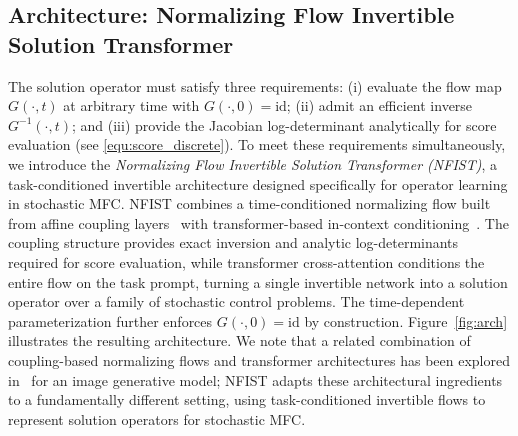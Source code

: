 \documentclass[preprint]{elsarticle}
\begin{document}
\subsection{Architecture: Normalizing Flow Invertible Solution Transformer}\label{sec:arch}

The solution operator must satisfy three requirements: (i) evaluate the flow map $G(\cdot,t)$ at arbitrary time with $G(\cdot,0)=\mathrm{id}$; (ii) admit an efficient inverse $G^{-1}(\cdot,t)$; and (iii) provide the Jacobian log-determinant analytically for score evaluation (see \eqref{equ:score_discrete}). 
To meet these requirements simultaneously, we introduce the \emph{Normalizing Flow Invertible Solution Transformer (NFIST)}, a task-conditioned invertible architecture designed specifically for operator learning in stochastic MFC. NFIST combines a time-conditioned normalizing flow built from affine coupling layers~\cite{dinh2017realnvp,rezende2015flow,Kobyzev2021,papamakarios2021nf} with transformer-based in-context conditioning~\cite{vaswani2017attention,yang2023icon}. The coupling structure provides exact inversion and analytic log-determinants required for score evaluation, while transformer cross-attention conditions the entire flow on the task prompt, turning a single invertible network into a solution operator over a family of stochastic control problems. The time-dependent parameterization further enforces $G(\cdot,0)=\mathrm{id}$ by construction. Figure~\ref{fig:arch} illustrates the resulting architecture.
We note that a related combination of coupling-based normalizing flows and transformer architectures has been explored in~\cite{kolesnikov2024jet} for an image generative model; NFIST adapts these architectural ingredients to a fundamentally different setting, using task-conditioned invertible flows to represent solution operators for stochastic MFC.
\end{document}
